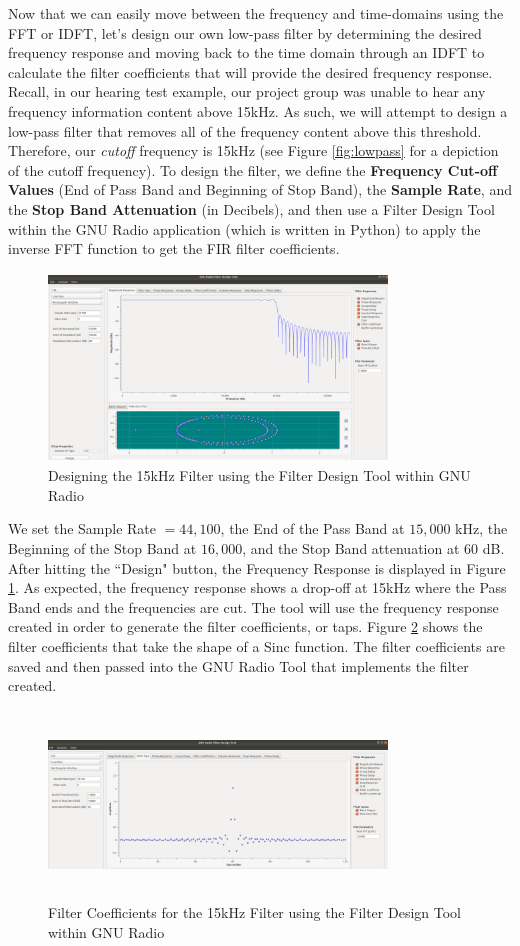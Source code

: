 Now that we can easily move between the frequency and time-domains using the FFT or IDFT, let's design our own low-pass filter by determining the desired frequency response and moving back to the time domain through an IDFT to calculate the filter coefficients that will provide the desired frequency response.  Recall, in our hearing test example, our project group was unable to hear any frequency information content above 15kHz.  As such, we will attempt to design a low-pass filter that removes all of the frequency content above this threshold.  Therefore, our \textit{cutoff} frequency is 15kHz (see Figure \ref{fig:lowpass} for a depiction of the cutoff frequency).  To design the filter, we define the  \textbf{Frequency Cut-off Values} (End of Pass Band and Beginning of Stop Band), the \textbf{Sample Rate}, and the \textbf{Stop Band Attenuation} (in Decibels), and then use a Filter Design Tool within the GNU Radio application (which is written in Python) to apply the inverse FFT function to get the FIR filter coefficients.  

\begin{figure}[h!]
	\centering
	\includegraphics[height = 5cm, width =9cm]{filter_tool_15kHz.png} %
	\caption{Designing the 15kHz Filter using the Filter Design Tool within GNU Radio}
	\label{fig:mainfilt}
\end{figure}  

We set the Sample Rate $= 44,100$, the End of the Pass Band at  $15,000$ kHz, the Beginning of the Stop Band at $16,000$, and the Stop Band attenuation at $60$ dB.  After hitting the ``Design" button, the Frequency Response is displayed in Figure \ref{fig:mainfilt}.  As expected, the frequency response shows a drop-off at 15kHz where the Pass Band ends and the frequencies are cut.  The tool will use the frequency response created in order to generate the filter coefficients, or taps.  Figure \ref{fig:taps15} shows the filter coefficients that take the shape of a Sinc function.  The filter coefficients are saved and then passed into the GNU Radio Tool that implements the filter created.      

\begin{figure}[h!]
	\centering
	\includegraphics[height = 5cm, width =9cm]{filter_tool_15kHz_taps.png} %
	\caption{Filter Coefficients for the 15kHz Filter using the Filter Design Tool within GNU Radio}
	\label{fig:taps15}
\end{figure}   
  
 
